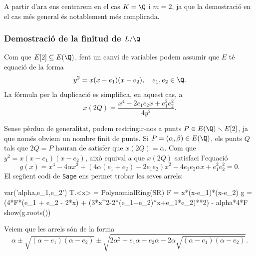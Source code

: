 %

A partir d'ara ens centrarem en el cas $K=\Q$ i $m=2$, ja que la demostració en el cas més general és notablement més complicada.

\subsubsection{Demostració de la finitud de $L/\Q$}
 Com que $E[2]\subseteq E(\Q)$, fent un canvi de variables podem assumir que $E$ té equació de la forma
 \[
 y^2 = x (x-e_1)(x-e_2),\quad e_1,e_2\in\Q.
 \]
 La fórmula per la duplicació es simplifica, en aquest cas, a
 \[
 x(2Q) = \frac{x^4-2e_1e_2x + e_1^2e_2^2}{4y^2}.
 \]
 
 Sense pèrdua de generalitat, podem restringir-nos a punts $P\in E(\Q)\setminus E[2]$, ja que només obviem un nombre finit de punts. Si $P=(\alpha,\beta)\in E(\Q)$, els punts $Q$ tals que $2Q=P$ hauran de satisfer que $x(2Q)=\alpha$. Com que $y^2=x(x-e_1)(x-e_2)$, això equival a que $x(2Q)$ satisfaci l'equació
 \[
 g(x) = x^4 - 4\alpha x^3 + (4\alpha(e_1+e_2)-2e_1e_2)x^2-4e_1e_2\alpha x + e_1^2e_2^2= 0.
 \]
 El següent codi de \texttt{Sage} ens permet trobar les seves arrels:
 \begin{python}
 var('alpha,e_1,e_2')
 T.<x> = PolynomialRing(SR)
 F = x*(x-e_1)*(x-e_2)
 g = (4*F*(e_1 + e_2 - 2*x) + 
     (3*x^2-2*(e_1+e_2)*x+e_1*e_2)**2) -
     alpha*4*F
 show(g.roots())
 \end{python}
 Veiem que les arrels són de la forma
 \[
 \alpha \pm \sqrt{(\alpha-e_1)(\alpha-e_2)} \pm \sqrt{2\alpha^2-e_1\alpha-e_2\alpha - 2\alpha\sqrt{(\alpha-e_1)(\alpha-e_2)}}.
 \]
 
